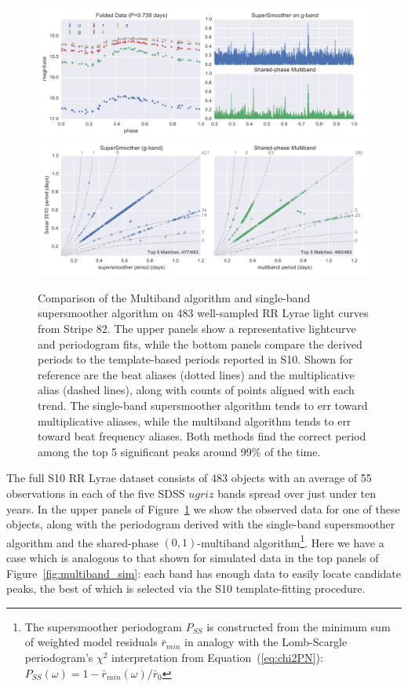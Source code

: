 \documentclass[12pt,preprint]{aastex}
\newcommand{\Fig}[1]{Figure~\ref{fig:#1}}
\newcommand{\fig}[1]{\Fig{#1}}
\newcommand{\figlabel}[1]{\label{fig:#1}}
\newcommand{\Eq}[1]{Equation~(\ref{eq:#1})}
\newcommand{\eq}[1]{\Eq{#1}}
\begin{document}
\begin{figure}
  \centering
  \includegraphics[width=\textwidth]{fig07a.pdf}
  \includegraphics[width=\textwidth]{fig07b.pdf}
  \caption{
    Comparison of the Multiband algorithm and single-band supersmoother algorithm on 483 well-sampled RR Lyrae light curves from Stripe 82.
    The upper panels show a representative lightcurve and periodogram fits, while the bottom panels compare the derived periods to the template-based periods reported in S10.
    Shown for reference are the beat aliases (dotted lines) and the multiplicative alias (dashed lines), along with counts of points aligned with each trend.
    The single-band supersmoother algorithm tends to err toward multiplicative aliases, while the multiband algorithm tends to err toward beat frequency aliases.
    Both methods find the correct period among the top 5 significant peaks around 99\% of the time.
  } 
  \figlabel{compare_periods}
\end{figure}

The full S10 RR Lyrae dataset consists of 483 objects with an average of 55 observations in each of the five SDSS $ugriz$ bands spread over just under ten years.  In the upper panels of \fig{compare_periods} we show the observed data for one of these objects, along with the periodogram derived with the single-band supersmoother algorithm and the shared-phase $(0, 1)$-multiband algorithm\footnote{The supersmoother periodogram $P_{SS}$ is constructed from the minimum sum of weighted model residuals $\bar{r}_{min}$ in analogy with the Lomb-Scargle periodogram's $\chi^2$ interpretation from \eq{chi2PN}: $P_{SS}(\omega) = 1 - \bar{r}_{min}(\omega) / \bar{r}_0$}. Here we have a case which is analogous to that shown for simulated data in the top panels of \fig{multiband_sim}: each band has enough data to easily locate candidate peaks, the best of which is selected via the S10 template-fitting procedure.
\end{document}
